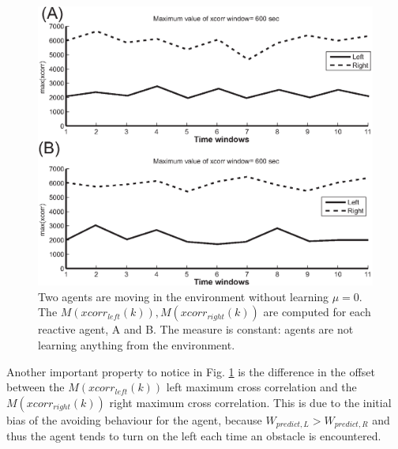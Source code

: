 \begin{figure}[ht]
  \begin{center}
    \includegraphics[scale=0.6]{figures/infomeasure/maxcorr_nolearn.eps}
    \caption[Max correlation for non learning agents]{
	     Two agents are moving in the environment without learning $\mu=0$.
	     The $M(xcorr_{left}(k)),M(xcorr_{right}(k))$ are computed for each reactive agent, A and B.
	     The measure is constant: agents are not learning anything from
	      the environment. \label{entropy:reactive}}
  \end{center}
\end{figure}
Another important property to notice in Fig. \ref{entropy:reactive} is the difference
in the offset between the $M(xcorr_{left}(k))$ left maximum cross correlation and
the $M(xcorr_{right}(k))$ right maximum cross correlation.
This is due to the initial bias of the avoiding behaviour for the agent, because 
$W_{predict,L}>W_{predict,R}$ and thus the agent tends to turn on the left each
time an obstacle is encountered.


